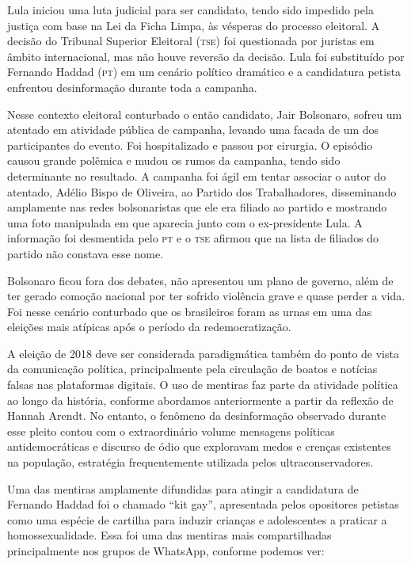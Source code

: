 Lula iniciou uma luta judicial para ser candidato, tendo sido impedido
pela justiça com base na Lei da Ficha Limpa, às vésperas do processo
eleitoral. A decisão do Tribunal Superior Eleitoral (\textsc{\textsc{tse}}) foi questionada por
juristas em âmbito internacional, mas não houve reversão da decisão.
Lula foi substituído por Fernando Haddad (\textsc{pt}) em um cenário político
dramático e a candidatura petista enfrentou desinformação durante toda a
campanha.

Nesse contexto eleitoral conturbado o então candidato, Jair Bolsonaro,
sofreu um atentado em atividade pública de campanha, levando uma facada
de um dos participantes do evento. Foi hospitalizado e passou por
cirurgia. O episódio causou grande polêmica e mudou os rumos da
campanha, tendo sido determinante no resultado. A campanha foi ágil em
tentar associar o autor do atentado, Adélio Bispo de Oliveira, ao
Partido dos Trabalhadores, disseminando amplamente nas redes
bolsonaristas que ele era filiado ao partido e mostrando uma foto
manipulada em que aparecia junto com o ex-presidente Lula. A informação
foi desmentida pelo \textsc{pt} e o \textsc{\textsc{tse}} afirmou que na
lista de filiados do partido não constava esse nome.

Bolsonaro ficou fora dos debates, não apresentou um plano de governo,
além de ter gerado comoção nacional por ter sofrido violência grave e
quase perder a vida. Foi nesse cenário conturbado que os brasileiros
foram as urnas em uma das eleições mais atípicas após o período da
redemocratização.

A eleição de 2018 deve ser considerada paradigmática também do ponto de
vista da comunicação política, principalmente pela circulação de boatos
e notícias falsas nas plataformas digitais. O uso de mentiras faz parte
da atividade política ao longo da história, conforme abordamos
anteriormente a partir da reflexão de Hannah Arendt. No entanto, o
fenômeno da desinformação observado durante esse pleito contou com o
extraordinário volume mensagens políticas antidemocráticas e discurso de
ódio que exploravam medos e crenças existentes na população, estratégia
frequentemente utilizada pelos ultraconservadores.

Uma das mentiras amplamente difundidas para atingir a candidatura de
Fernando Haddad foi o chamado ``kit gay'', apresentada pelos opositores
petistas como uma espécie de cartilha para induzir crianças e
adolescentes a praticar a homossexualidade. Essa foi uma das mentiras
mais compartilhadas principalmente nos grupos de WhatsApp, conforme
podemos ver:

